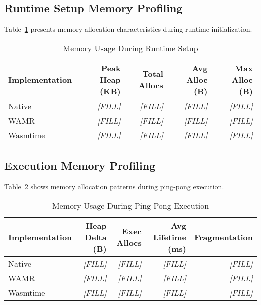 \subsection{Runtime Setup Memory Profiling}
\label{subsec:memory-setup}

Table~\ref{tab:memory-setup} presents memory allocation characteristics during runtime initialization.

\begin{table}[htbp]
\centering
\caption{Memory Usage During Runtime Setup}
\label{tab:memory-setup}
\begin{tabular}{lrrrr}
\toprule
\textbf{Implementation} & \textbf{Peak Heap (KB)} & \textbf{Total Allocs} & \textbf{Avg Alloc (B)} & \textbf{Max Alloc (B)} \\
\midrule
Native        & \textit{[FILL]} & \textit{[FILL]} & \textit{[FILL]} & \textit{[FILL]} \\
WAMR          & \textit{[FILL]} & \textit{[FILL]} & \textit{[FILL]} & \textit{[FILL]} \\
Wasmtime      & \textit{[FILL]} & \textit{[FILL]} & \textit{[FILL]} & \textit{[FILL]} \\
\bottomrule
\end{tabular}
\end{table}

\subsection{Execution Memory Profiling}
\label{subsec:memory-execution}

Table~\ref{tab:memory-execution} shows memory allocation patterns during ping-pong execution.

\begin{table}[htbp]
\centering
\caption{Memory Usage During Ping-Pong Execution}
\label{tab:memory-execution}
\begin{tabular}{lrrrr}
\toprule
\textbf{Implementation} & \textbf{Heap Delta (B)} & \textbf{Exec Allocs} & \textbf{Avg Lifetime (ms)} & \textbf{Fragmentation} \\
\midrule
Native        & \textit{[FILL]} & \textit{[FILL]} & \textit{[FILL]} & \textit{[FILL]} \\
WAMR          & \textit{[FILL]} & \textit{[FILL]} & \textit{[FILL]} & \textit{[FILL]} \\
Wasmtime      & \textit{[FILL]} & \textit{[FILL]} & \textit{[FILL]} & \textit{[FILL]} \\
\bottomrule
\end{tabular}
\end{table}

